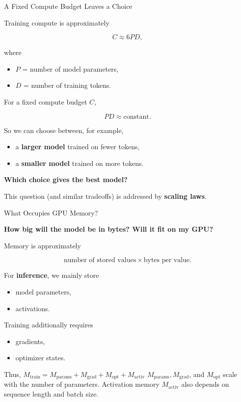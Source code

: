 \documentclass[11pt,compress,t,notes=noshow, xcolor=table]{beamer}
\begin{document}
\begin{vbframe}{A Fixed Compute Budget Leaves a Choice}

Training compute is approximately

\[
C \approx 6PD,
\]

where

\begin{itemize}
    \item $P$ = number of model parameters,
    \item $D$ = number of training tokens.
\end{itemize}

For a fixed compute budget $C$,

\[
PD \approx \text{constant}.
\]

So we can choose between, for example,

\begin{itemize}
    \item a \textbf{larger model} trained on fewer tokens,
    \item a \textbf{smaller model} trained on more tokens.
\end{itemize}

\begin{center}
\textbf{Which choice gives the best model?}
\end{center}

This question (and similar tradeoffs) is addressed by \textbf{scaling laws}.

\end{vbframe}


\begin{vbframe}{What Occupies GPU Memory?}

\textbf{How big will the model be in bytes? Will it fit on my GPU?}

Memory is approximately

\[
\text{number of stored values}
\times
\text{bytes per value}.
\]

For \textbf{inference}, we mainly store

\begin{itemize}
    \item model parameters,
    \item activations.
\end{itemize}

Training additionally requires

\begin{itemize}
    \item gradients,
    \item optimizer states.
\end{itemize}

Thus, $\boxed{
M_{\text{train}}
=
M_{\text{params}}
+
M_{\text{grad}}
+
M_{\text{opt}}
+
M_{\text{activ}}
}$
\vskip3mm
$M_{\text{params}}, M_{\text{grad}}$, and $M_{\text{opt}}$ scale with the number of parameters. Activation memory $M_{\text{activ}}$ also depends on sequence length and batch size.
\end{vbframe}
\end{document}
